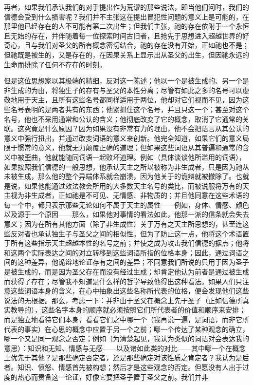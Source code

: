 再者，如果我们承认我们的对手提出作为荒谬的那些说法，即当他们问时，我们的信德会受到什么损害呢？我们并不主张这在提出冒犯性问题的意义上是可能的，在那里他已经存在的人不可能有第二次出生；但我们主张，祂的存在依附于一个永恒且无始的存在，并伴随着每一位探索时间古旧者，且抢先于思想进入超越世界的好奇心，且与我们对圣父的所有概念密切结合，祂的存在没有开始，正如祂也不是；但祂既是被生的，又是存在的，在因果关系上显示出从圣父的出生，但因祂永远的生命而排除了任何不存在的时刻。\par

但是这位思想家以其极端的精细，反对这一陈述；他以一个是被生成的、另一个是非生成的为由，将独生子的存有与圣父的本性分离；尽管有如此之多的名号可以虔敬地用于天主，且所有这些名号都同样适用于两位，他却对它们视而不见，因为这些名号表明的是两者共有的东西；他紧抓住这个名号，并且只这一个；甚至对这个名号，他也不采用通常和公认的含义；他彻底改变了它的概念，取消了它通常的关联。这究竟是什么原因？因为如果没有非常有力的理由，他不会把语言从其公认的意义中强行扭出，并通过改变词语的意义来创新。他完全知道，如果它们的意义局限于惯常的意义，他就无力颠覆正确的道理；但如果这些词语从其普遍和通常的含义中被歪曲，他就能随同词语一起败坏道理。例如（具体谈谈他所滥用的词语），如果按照我们信德的一般思想，他承认天主之所以被称为非生成者，只是因为祂从未被生成，那么他的整个异端体系就会崩溃，因为他关于的诡辩就被撤除了。也就是说，如果他能通过效法教会所用的大多数天主名号的类比，而被说服将万有的天主视为非生成者，正如祂是不可见、无情感、非物质的；并且他同意在这些术语的每一个中，都只表示那些无论如何不属于天主的属性——例如，身体、情感、颜色以及源于一个原因——那么，如果他对事情的看法如此，他那一派的信条就会失去意义；因为在所有其他方面（除了非生成性）关于万有之天主所思想的，甚至连这些反对者也承认独生子与圣父之间的相似性。但为了防止这一点，他将这个术语置于所有这些指示天主超越本性的名号之前；并使之成为攻击我们信德的据点；他将和这两个实际表达之间的对立转移到这些词语所指的位格本身；因此，通过词语之间的这种差异，他诡辩地论证存有之间的差异；不同意我们所说的只用于因为圣子是被生成的，而是因为圣父存在而没有经过生成；却肯定他认为前者是通过被生成而获得了存在；尽管我不知道是什么样的哲学导致他得出这种看法。如果人们只注意这些词语本身的含义，在心中抽象出这些名称所代表的位格，便会发现他们这些说法的无根据。那么，考虑一下：并非由于圣父在概念上先于圣子（正如信德所真实教导的），这些名字本身的顺序就必须按照它们所代表者的价值和顺序来安排；而是独立地看待它们本身，看看它们之中哪一个（我再说一遍，是词语，而非它所代表的事实）在心思的概念中应置于另一个之前；哪一个传达了某种观念的确立，哪一个又是同一观念之否定；例如（为清楚起见，我认为类似的词语对会表达我的意思）：知识和无知、情感与无感——以及诸如此类的对比——其中哪一个在概念上优先于其他？是那些确定否定者，还是那些确定对该性质之肯定者？我认为是后者。知识、愤怒、情感首先被构想；然后才是这些观念的否定。但愿没有人出于过度的热心而责备这一论证，好像它要把圣子置于圣父之前。我们并非